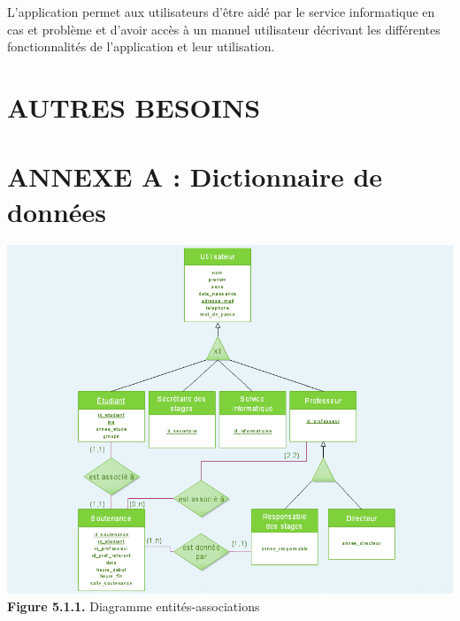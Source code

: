 \documentclass{scrreprt}
\begin{document}
\hspace{0.6cm}L'application permet aux utilisateurs d'être aidé par le service informatique en cas et problème et d'avoir accès à un manuel utilisateur décrivant les différentes fonctionnalités de l'application et leur utilisation.





\chapter{AUTRES BESOINS}



\appendix
\chapter*{ANNEXE A : Dictionnaire de données}

\begin{center}
	\includegraphics[scale=0.45]{image/diagentiassoc.png}
	\vspace {0.5cm}
	\textbf{Figure 5.1.1.} Diagramme entités-associations
\end{center}
\end{document}
